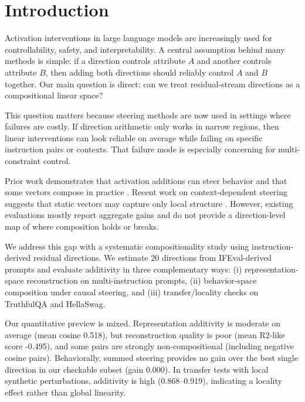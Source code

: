 \section{Introduction}
\label{sec:introduction}
Activation interventions in large language models are increasingly used for controllability, safety, and interpretability. A central assumption behind many methods is simple: if a direction controls attribute $A$ and another controls attribute $B$, then adding both directions should reliably control $A$ and $B$ together. Our main question is direct: can we treat residual-stream directions as a compositional linear space?

This question matters because steering methods are now used in settings where failures are costly. If direction arithmetic only works in narrow regions, then linear interventions can look reliable on average while failing on specific instruction pairs or contexts. That failure mode is especially concerning for multi-constraint control.

Prior work demonstrates that activation additions can steer behavior and that some vectors compose in practice \citep{turner2023activation,panickssery2024caa,todd2024function,stolfo2025instruction}. Recent work on context-dependent steering suggests that static vectors may capture only local structure \citep{li2026vectorfields}. However, existing evaluations mostly report aggregate gains and do not provide a direction-level map of where composition holds or breaks.

We address this gap with a systematic compositionality study using instruction-derived residual directions. We estimate 20 directions from IFEval-derived prompts and evaluate additivity in three complementary ways: (i) representation-space reconstruction on multi-instruction prompts, (ii) behavior-space composition under causal steering, and (iii) transfer/locality checks on TruthfulQA and HellaSwag.

Our quantitative preview is mixed. Representation additivity is moderate on average (mean cosine 0.518), but reconstruction quality is poor (mean R2-like score -0.495), and some pairs are strongly non-compositional (including negative cosine pairs). Behaviorally, summed steering provides no gain over the best single direction in our checkable subset (gain 0.000). In transfer tests with local synthetic perturbations, additivity is high (0.868--0.919), indicating a locality effect rather than global linearity.

